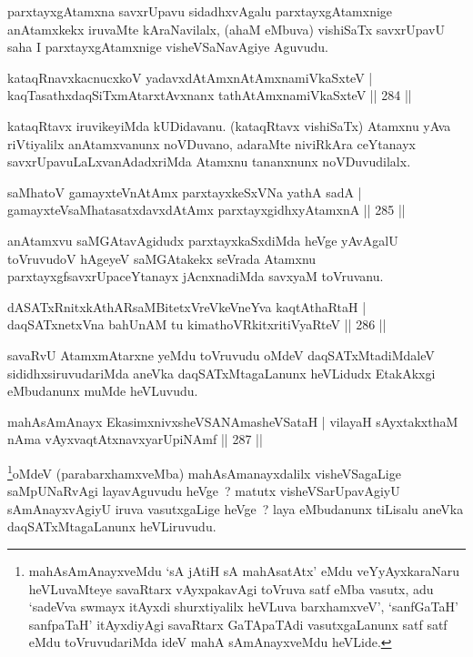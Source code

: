\begin{artha}
parxtayxgAtamxna savxrUpavu sidadhxvAgalu parxtayxgAtamxnige anAtamxkekx iruvaMte kAraNavilalx, (ahaM eMbuva) vishiSaTx savxrUpavU saha I parxtayxgAtamxnige visheVSaNavAgiye Aguvudu.
\end{artha}

\begin{shl}
kataqRnavxkacnucxkoV yadavxdAtAmx\s nAtAmxnamiVkaSxteV |
kaqTasathxdaqSiTxmAtarxtAvxnanx tathA\s \s tAmxnamiVkaSxteV \hfill || 284 ||
\end{shl}

\begin{artha}
kataqRtavx iruvikeyiMda kUDidavanu. (kataqRtavx vishiSaTx) Atamxnu yAva riVtiyalilx anAtamxvanunx noVDuvano, adaraMte niviRkAra ceYtanayx savxrUpavuLaLxvanAdadxriMda Atamxnu tananxnunx noVDuvudilalx.
\end{artha}

\begin{shl}
saMhatoV gamayxteV\s nAtAmx parxtayxkeSxVNa yathA sadA |
gamayxteV\s saMhatasatxdavxdAtAmx parxtayxgidhxyA\s \s tamxnA \hfill || 285 ||
\end{shl}

\begin{artha}
anAtamxvu saMGAtavAgidudx parxtayxkaSxdiMda heVge yAvAgalU toVruvudoV hAgeyeV saMGAtakekx seVrada Atamxnu parxtayxgfsavxrUpaceYtanayx jAcnxnadiMda savxyaM toVruvanu.
\end{artha}

\begin{shl}
dASATxRnitxkAthARsaMBitetxVreVkeVneYva kaqtAthaRtaH |
daqSATxnetxVna bahUnAM tu kimathoVRkitxritiVyaRteV \hfill || 286 ||
\end{shl}

\begin{artha}
savaRvU AtamxmAtarxne yeMdu toVruvudu oMdeV daqSATxMtadiMdaleV sididhxsiruvudariMda aneVka daqSATxMtagaLanunx heVLidudx EtakAkxgi eMbudanunx muMde heVLuvudu.
\end{artha}

\begin{shl}
mahAsAmAnayx EkasimxnivxsheVSANAmasheVSataH |
vilayaH sAyxtakxthaM nAma vAyxvaqtAtxnavxyarUpiNAmf \hfill || 287 ||
\end{shl}

\begin{artha}
\footnote[1]{mahAsAmAnayxveMdu `sA jAtiH sA mahAsatAtx' eMdu veYyAyxkaraNaru heVLuvaMteye savaRtarx vAyxpakavAgi toVruva satf eMba vasutx, adu `sadeVva swmayx itAyxdi shurxtiyalilx heVLuva barxhamxveV', `sanfGaTaH' sanfpaTaH' itAyxdiyAgi savaRtarx GaTApaTAdi vasutxgaLanunx satf satf eMdu toVruvudariMda ideV mahA sAmAnayxveMdu heVLide.}oMdeV (parabarxhamxveMba) mahAsAmanayxdalilx visheVSagaLige saMpUNaRvAgi layavAguvudu heVge~? matutx visheVSarUpavAgiyU sAmAnayxvAgiyU iruva vasutxgaLige heVge~? laya eMbudanunx tiLisalu aneVka daqSATxMtagaLanunx heVLiruvudu.
\end{artha}

